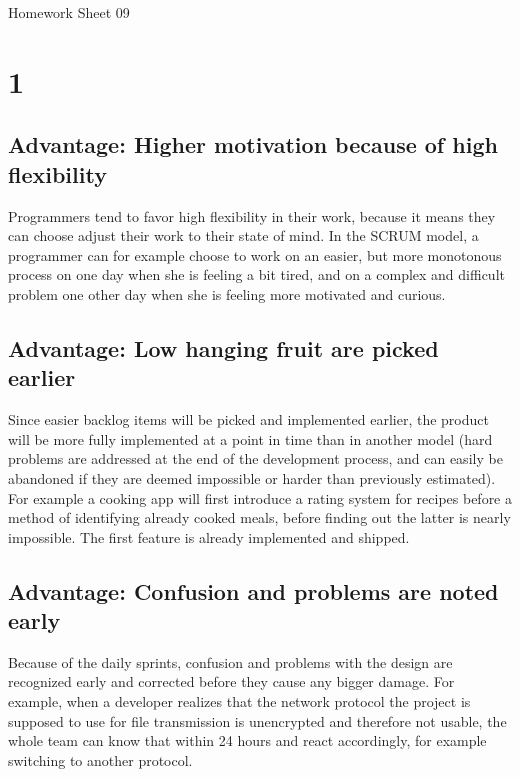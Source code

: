 \documentclass[11pt,a4paper]{article}
\begin{document}
\begin{center}
{\Large Homework Sheet 09}
\end{center}

\thispagestyle{empty}
\pagestyle{empty}

\section*{1}

\subsection*{Advantage: Higher motivation because of high flexibility}

Programmers tend to favor high flexibility in their work, because it
means they can choose adjust their work to their state of mind. In the
SCRUM model, a programmer can for example choose to work on an easier,
but more monotonous process on one day when she is feeling a bit tired,
and on a complex and difficult problem one other day when she is feeling
more motivated and curious.

\subsection*{Advantage: Low hanging fruit are picked earlier}

Since easier backlog items will be picked and implemented earlier, the
product will be more fully implemented at a point in time than in another
model (hard problems are addressed at the end of the development process,
and can easily be abandoned if they are deemed impossible or harder than
previously estimated). For example a cooking app will first introduce
a rating system for recipes before a method of identifying already cooked
meals, before finding out the latter is nearly impossible. The first feature
is already implemented and shipped.

\subsection*{Advantage: Confusion and problems are noted early}

Because of the daily sprints, confusion and problems with the design are
recognized early and corrected before they cause any bigger damage.
For example, when a developer realizes that the network protocol the
project is supposed to use for file transmission is unencrypted
and therefore not usable, the whole team can know that within 24 hours
and react accordingly, for example switching to another protocol.
\end{document}
